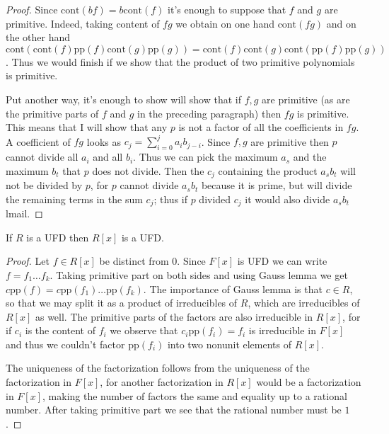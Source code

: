 \begin{proof}
Since $\text{cont}(bf)=b\text{cont}(f)$ it's enough to suppose that  $f$ and $g$
are primitive. Indeed, taking content of $fg$ we obtain on one hand
$\text{cont}(fg)$ and on the other hand
$\text{cont}(\text{cont}(f)\text{pp}(f)\text{cont}(g)\text{pp}(g))
=\text{cont}(f)\text{cont}(g)\text{cont}(\text{pp}(f)\text{pp}(g))$. 
Thus we would finish if we show that the product of two primitive polynomials is
primitive.

Put another way, it's enough to show will show that if $f,g$ are primitive (as
are the primitive parts of $f$ and $g$ in the preceding paragraph) then $fg$ is
primitive. This means that I will show that any $p$ is not a factor of all the
coefficients in $fg$. A coefficient of $fg$ looks as
$c_j=\sum_{i=0}^ja_ib_{j-i}$.  Since $f,g$ are primitive then $p$ cannot divide
all $a_i$ and all $b_i$.  Thus we can pick the maximum $a_s$ and the maximum
$b_t$ that $p$ does not divide. Then the $c_j$ containing the product $a_sb_t$
will not be divided by $p$, for $p$ cannot divide $a_sb_t$ because it is prime,
but will divide the remaining terms in the sum $c_j$; thus if $p$ divided $c_j$
it would also divide $a_sb_t$lmail.
\end{proof}

\begin{lemma}[Gauss]
\label{lemma-R-UFD-implies-R[x]-UFD}
\begin{reference}
\cite[Chapter 4, Theorem 2.3]{Lang-algebra}
\end{reference}
If $R$ is a UFD then $R[x]$ is a UFD.
\end{lemma}

\begin{proof}
Let $f\in R[x]$ be distinct from 0. Since $F[x]$ is UFD we can write
$f=f_1\ldots f_k$. Taking primitive part on both sides and using Gauss lemma we
get $c\text{pp}(f)=c \text{pp}(f_1)\ldots\text{pp}(f_k)$. The importance of
Gauss lemma is that $c \in R$, so that we may split it as a product of
irreducibles of $R$, which are irreducibles of $R[x]$ as well. The primitive
parts of the factors are also irreducible in $R[x]$, for if $c_i$ is the content
of $f_i$ we observe that $c_i\text{pp}(f_i)=f_i$ is irreducible in $F[x]$ and
thus we couldn't factor $\text{pp}(f_i)$ into two nonunit elements of $R[x]$.

The uniqueness of the factorization follows from the uniqueness of the
factorization in $F[x]$, for another factorization in $R[x]$ would be a
factorization in $F[x]$, making the number of factors the same and equality up
to a rational number. After taking primitive part we see that the rational
number must be $1$.
\end{proof}

